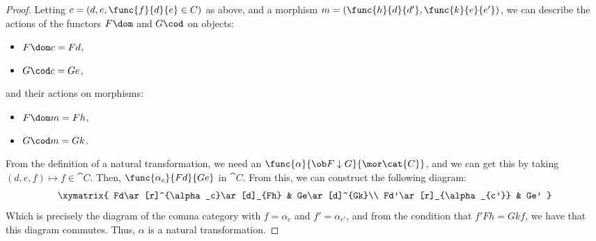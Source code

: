 \documentclass[../../main]{subfiles}
\begin{document}
\begin{proof}
	Letting $c=(d,e,\func{f}{d}{e}\in C)$ as above, and a morphism
	$m=(\func{h}{d}{d'},\func{k}{e}{e'})$, we can describe the actions of the
	functors $F\dom$ and $G\cod$ on objects:
	\begin{itemize}
		\item $F\dom c = Fd$,
		\item $G\cod c = Ge$,
	\end{itemize}
	and their actions on morphisms:
	\begin{itemize}
		\item $F\dom m = Fh$,
		\item $G\cod m = Gk$.
	\end{itemize}
	From the definition of a natural transformation, we need an
	$\func{\alpha}{\ob F\downarrow G}{\mor\cat{C}}$, and we can get this by
	taking $(d,e,f)\mapsto f\in \cat{C}$. Then, $\func{\alpha_c}{Fd}{Ge}$ in
	$\cat{C}$. From this, we can construct the following diagram:
	\[\xymatrix{
		Fd\ar[r]^{\alpha_c}\ar[d]_{Fh} & Ge\ar[d]^{Gk}\\
		Fd'\ar[r]_{\alpha_{c'}} & Ge'
	}\]
	Which is precisely the diagram of the comma category with $f=\alpha_c$ and
	$f'=\alpha_{c'}$, and from the condition that $f'Fh = Gk f$, we
	have that this diagram commutes. Thus, $\alpha$ is a natural
	transformation.
\end{proof}
\end{document}
